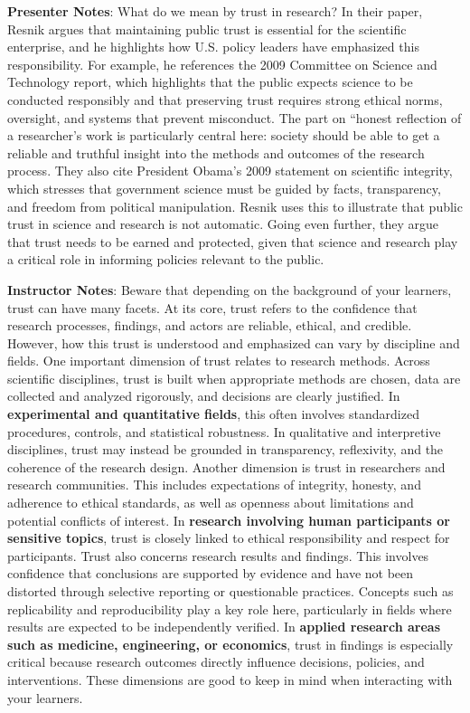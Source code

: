 \documentclass[
  english,
  letterpaper,
  DIV=11,
  numbers=noendperiod]{scrartcl}
\begin{document}
\textbf{Presenter Notes}: What do we mean by trust in research? In their
paper, Resnik argues that maintaining public trust is essential for the
scientific enterprise, and he highlights how U.S. policy leaders have
emphasized this responsibility. For example, he references the 2009
Committee on Science and Technology report, which highlights that the
public expects science to be conducted responsibly and that preserving
trust requires strong ethical norms, oversight, and systems that prevent
misconduct. The part on ``honest reflection of a researcher's work is
particularly central here: society should be able to get a reliable and
truthful insight into the methods and outcomes of the research process.
They also cite President Obama's 2009 statement on scientific integrity,
which stresses that government science must be guided by facts,
transparency, and freedom from political manipulation. Resnik uses this
to illustrate that public trust in science and research is not
automatic. Going even further, they argue that trust needs to be earned
and protected, given that science and research play a critical role in
informing policies relevant to the public.

\textbf{Instructor Notes}: Beware that depending on the background of
your learners, trust can have many facets. At its core, trust refers to
the confidence that research processes, findings, and actors are
reliable, ethical, and credible. However, how this trust is understood
and emphasized can vary by discipline and fields. One important
dimension of trust relates to research methods. Across scientific
disciplines, trust is built when appropriate methods are chosen, data
are collected and analyzed rigorously, and decisions are clearly
justified. In \textbf{experimental and quantitative fields}, this often
involves standardized procedures, controls, and statistical robustness.
In qualitative and interpretive disciplines, trust may instead be
grounded in transparency, reflexivity, and the coherence of the research
design. Another dimension is trust in researchers and research
communities. This includes expectations of integrity, honesty, and
adherence to ethical standards, as well as openness about limitations
and potential conflicts of interest. In \textbf{research involving human
participants or sensitive topics}, trust is closely linked to ethical
responsibility and respect for participants. Trust also concerns
research results and findings. This involves confidence that conclusions
are supported by evidence and have not been distorted through selective
reporting or questionable practices. Concepts such as replicability and
reproducibility play a key role here, particularly in fields where
results are expected to be independently verified. In \textbf{applied
research areas such as medicine, engineering, or economics}, trust in
findings is especially critical because research outcomes directly
influence decisions, policies, and interventions. These dimensions are
good to keep in mind when interacting with your learners.
\end{document}
